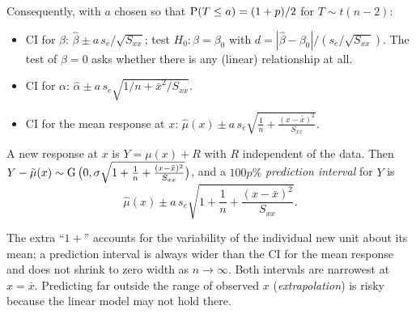 Consequently, with $a$ chosen so that $\operatorname{P}(T\le a) = (1+p)/2$ for $T\sim t(n-2)$:
\begin{itemize}
  \item CI for $\beta$: $\hat\beta\pm a\,s_e/\sqrt{S_{xx}}$; test $H_0:\beta=\beta_0$ with
        $d = |\hat\beta-\beta_0|/(s_e/\sqrt{S_{xx}})$. The test of $\beta=0$ asks whether
        there is any (linear) relationship at all.
  \item CI for $\alpha$: $\hat\alpha\pm a\,s_e\sqrt{1/n + \bar x^2/S_{xx}}$.
  \item CI for the mean response at $x$: $\hat\mu(x)\pm a\,s_e\sqrt{\frac1n +
        \frac{(x-\bar x)^2}{S_{xx}}}$.
\end{itemize}

\begin{theorem}
A new response at $x$ is $Y = \mu(x) + R$ with $R$ independent of the data. Then
$Y - \tilde\mu(x)\sim\operatorname{G}\big(0,\sigma\sqrt{1 + \frac1n+\frac{(x-\bar x)^2}{S_{xx}}}\big)$,
and a $100p\%$ \emph{prediction interval} for $Y$ is
\[
\hat\mu(x)\pm a\,s_e\sqrt{1+\frac1n + \frac{(x-\bar x)^2}{S_{xx}}}.
\]
\end{theorem}

The extra ``$1+$'' accounts for the variability of the individual new unit about its mean;
a prediction interval is always wider than the CI for the mean response and does not shrink
to zero width as $n\to\infty$. Both intervals are narrowest at $x=\bar x$. Predicting far
outside the range of observed $x$ (\emph{extrapolation}) is risky because the linear
model may not hold there.

